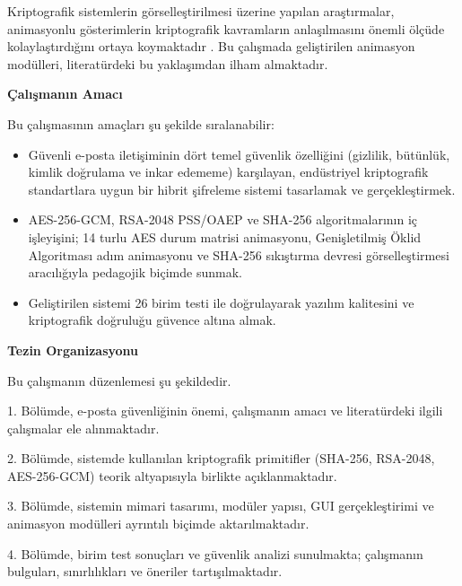 Kriptografik sistemlerin görselleştirilmesi üzerine yapılan araştırmalar, animasyonlu gösterimlerin kriptografik kavramların anlaşılmasını önemli ölçüde kolaylaştırdığını ortaya koymaktadır \cite{CryptoVis}. Bu çalışmada geliştirilen animasyon modülleri, literatürdeki bu yaklaşımdan ilham almaktadır.

\textbf{Çalışmanın Amacı}

Bu çalışmasının amaçları şu şekilde sıralanabilir:

\begin{itemize}
  	\item Güvenli e-posta iletişiminin dört temel güvenlik özelliğini (gizlilik, bütünlük, kimlik doğrulama ve inkar edememe) karşılayan, endüstriyel kriptografik standartlara uygun bir hibrit şifreleme sistemi tasarlamak ve gerçekleştirmek.

  	\item AES-256-GCM, RSA-2048 PSS/OAEP ve SHA-256 algoritmalarının iç işleyişini; 14 turlu AES durum matrisi animasyonu, Genişletilmiş Öklid Algoritması adım animasyonu ve SHA-256 sıkıştırma devresi görselleştirmesi aracılığıyla pedagojik biçimde sunmak.

  	\item Geliştirilen sistemi 26 birim testi ile doğrulayarak yazılım kalitesini ve kriptografik doğruluğu güvence altına almak.
\end{itemize}

\textbf{Tezin Organizasyonu}

Bu çalışmanın düzenlemesi şu şekildedir.

1. Bölümde, e-posta güvenliğinin önemi, çalışmanın amacı ve literatürdeki ilgili çalışmalar ele alınmaktadır.

2. Bölümde, sistemde kullanılan kriptografik primitifler (SHA-256, RSA-2048, AES-256-GCM) teorik altyapısıyla birlikte açıklanmaktadır.

3. Bölümde, sistemin mimari tasarımı, modüler yapısı, GUI gerçekleştirimi ve animasyon modülleri ayrıntılı biçimde aktarılmaktadır.

4. Bölümde, birim test sonuçları ve güvenlik analizi sunulmakta; çalışmanın bulguları, sınırlılıkları ve öneriler tartışılmaktadır.

